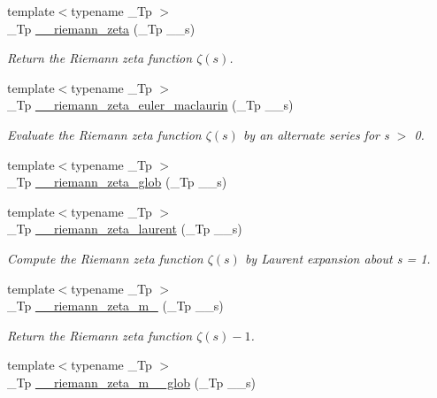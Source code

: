 \begin{DoxyCompactItemize}
{\footnotesize template$<$typename \+\_\+\+Tp $>$ }\\\+\_\+\+Tp \hyperlink{namespacestd_1_1____detail_a2be77d9bdd1b8b463be44a0e7558bc2a}{\+\_\+\+\_\+riemann\+\_\+zeta} (\+\_\+\+Tp \+\_\+\+\_\+s)
\begin{DoxyCompactList}\small\item\em Return the Riemann zeta function $ \zeta(s) $. \end{DoxyCompactList}\item 
{\footnotesize template$<$typename \+\_\+\+Tp $>$ }\\\+\_\+\+Tp \hyperlink{namespacestd_1_1____detail_a84ac805996c4eeb8cbfa181e6e47f0ae}{\+\_\+\+\_\+riemann\+\_\+zeta\+\_\+euler\+\_\+maclaurin} (\+\_\+\+Tp \+\_\+\+\_\+s)
\begin{DoxyCompactList}\small\item\em Evaluate the Riemann zeta function $ \zeta(s) $ by an alternate series for s $>$ 0. \end{DoxyCompactList}\item 
{\footnotesize template$<$typename \+\_\+\+Tp $>$ }\\\+\_\+\+Tp \hyperlink{namespacestd_1_1____detail_ab3542ea44b34da3d4865ed9a014e2951}{\+\_\+\+\_\+riemann\+\_\+zeta\+\_\+glob} (\+\_\+\+Tp \+\_\+\+\_\+s)
\item 
{\footnotesize template$<$typename \+\_\+\+Tp $>$ }\\\+\_\+\+Tp \hyperlink{namespacestd_1_1____detail_a5aa95e3482a58e4bd0a7f8395f88fe1c}{\+\_\+\+\_\+riemann\+\_\+zeta\+\_\+laurent} (\+\_\+\+Tp \+\_\+\+\_\+s)
\begin{DoxyCompactList}\small\item\em Compute the Riemann zeta function $ \zeta(s) $ by Laurent expansion about s = 1. \end{DoxyCompactList}\item 
{\footnotesize template$<$typename \+\_\+\+Tp $>$ }\\\+\_\+\+Tp \hyperlink{namespacestd_1_1____detail_a174bfa28eeb176b90ff251b5affbecb2}{\+\_\+\+\_\+riemann\+\_\+zeta\+\_\+m\+\_} (\+\_\+\+Tp \+\_\+\+\_\+s)
\begin{DoxyCompactList}\small\item\em Return the Riemann zeta function $ \zeta(s) - 1 $. \end{DoxyCompactList}\item 
{\footnotesize template$<$typename \+\_\+\+Tp $>$ }\\\+\_\+\+Tp \hyperlink{namespacestd_1_1____detail_ac7a15aa2658fef76642cebd7858fa0ff}{\+\_\+\+\_\+riemann\+\_\+zeta\+\_\+m\+\_\+\_\+glob} (\+\_\+\+Tp \+\_\+\+\_\+s)

\end{DoxyCompactItemize}
